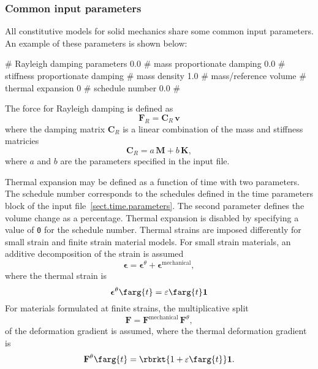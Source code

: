 \subsubsection{Common input parameters}
\label{sect.material.solid.common}
All constitutive models for solid mechanics share some common input 
parameters. An example of these parameters is shown below:
\begin{inputfile}
# Rayleigh damping parameters
0.0   # mass proportionate damping    
0.0   # stiffness proportionate damping
# mass density
1.0   # mass/reference volume
# thermal expansion
0     # schedule number
0.0   # %
\end{inputfile}

The force for Rayleigh damping is defined as
\begin{equation}
	\mathbf{F}_{R} = \mathbf{C}_{R}\,\mathbf{v}
\end{equation}
where the damping matrix $\mathbf{C}_{R}$ is a linear combination
of the mass and stiffness matricies
\begin{equation}
	\mathbf{C}_{R} = a\,\mathbf{M} + b\,\mathbf{K},
\end{equation}
where $a$ and $b$ are the parameters specified in the input file.

Thermal expansion may be defined as a function of time with 
two parameters. The schedule number 
corresponds to the schedules defined in the time parameters block of 
the input file~\ref{sect.time.parameters}. The second parameter defines the 
volume change as a percentage. Thermal expansion is disabled by 
specifying a value of \texttt{0} for the schedule number. 
Thermal strains are imposed 
differently for small strain and finite 
strain material models. For small strain materials, an additive decomposition 
of the strain is assumed
\begin{equation}
\boldsymbol{\epsilon} = 
    \boldsymbol{\epsilon}^{\theta} + 
	\boldsymbol{\epsilon}^{\mathrm{mechanical}},
\end{equation}
where the thermal strain is 
\begin{equation}
\boldsymbol{\epsilon}^{\theta}\farg{t} = \varepsilon\farg{t} \mathbf{1}
\end{equation}
For materials formulated at finite strains, the multiplicative split 
\begin{equation}
\mathbf{F} = \mathbf{F}^{\mathrm{mechanical}}\,
\mathbf{F}^{\theta},
\end{equation}
of the deformation 
gradient is assumed,
where the thermal deformation gradient is
\begin{equation}
\mathbf{F}^{\theta}\farg{t} = \rbrkt{1 + \varepsilon\farg{t}} \mathbf{1}.
\end{equation}

